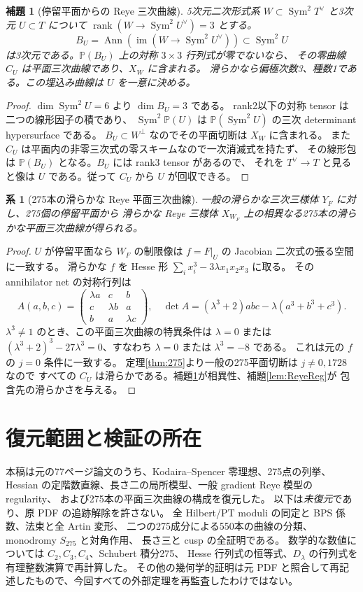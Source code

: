 \documentclass[11pt,a4paper]{ltjsarticle}
\newtheorem{lemma}[theorem]{補題}
\newtheorem{corollary}[theorem]{系}
\newcommand{\PP}{\mathbb P}
\newcommand{\Sym}{\operatorname{Sym}}
\newcommand{\rk}{\operatorname{rank}}
\newcommand{\Ann}{\operatorname{Ann}}
\begin{document}
\begin{lemma}[停留平面からの Reye 三次曲線]\label{lem:CU}
5次元二次形式系 $W\subset\Sym^2T^\vee$ と3次元 $U\subset T$ について
$\rk(W\to\Sym^2U^\vee)=3$ とする。
\[
 B_U=\Ann(\operatorname{im}(W\to\Sym^2U^\vee))\subset\Sym^2U
\]
は3次元である。$\PP(B_U)$ 上の対称 $3\times3$ 行列式が零でないなら、
その零曲線 $C_U$ は平面三次曲線であり、$X_W$ に含まれる。
滑らかなら偏極次数3、種数1である。この埋込み曲線は $U$ を一意に決める。
\end{lemma}
\begin{proof}
$\dim\Sym^2U=6$ より $\dim B_U=3$ である。
rank2以下の対称 tensor は二つの線形因子の積であり、
$\Sym^2\PP(U)$ は $\PP(\Sym^2U)$ の三次 determinant hypersurface である。
$B_U\subset W^\perp$ なのでその平面切断は $X_W$ に含まれる。
また $C_U$ は平面内の非零三次式の零スキームなので一次消滅式を持たず、
その線形包は $\PP(B_U)$ となる。$B_U$ には rank3 tensor があるので、
それを $T^\vee\to T$ と見ると像は $U$ である。従って $C_U$ から $U$ が回収できる。
\end{proof}

\begin{corollary}[275本の滑らかな Reye 平面三次曲線]\label{cor:275CU}
一般の滑らかな三次三様体 $Y_F$ に対し、275個の停留平面から
滑らかな Reye 三様体 $X_{W_F}$ 上の相異なる275本の滑らかな平面三次曲線が得られる。
\end{corollary}
\begin{proof}
$U$ が停留平面なら $W_F$ の制限像は $f=F|_U$ の Jacobian 二次式の張る空間に一致する。
滑らかな $f$ を Hesse 形 $\sum_i x_i^3-3\lambda x_1x_2x_3$ に取る。
その annihilator net の対称行列は
\[
 A(a,b,c)=\begin{pmatrix}\lambda a&c&b\\c&\lambda b&a\\b&a&\lambda c\end{pmatrix},
\quad \det A=(\lambda^3+2)abc-\lambda(a^3+b^3+c^3).
\]
$\lambda^3\ne1$ のとき、この平面三次曲線の特異条件は
$\lambda=0$ または $(\lambda^3+2)^3-27\lambda^3=0$、すなわち
$\lambda=0$ または $\lambda^3=-8$ である。
これは元の $f$ の $j=0$ 条件に一致する。
定理\ref{thm:275}より一般の275平面切断は $j\ne0,1728$ なので
すべての $C_U$ は滑らかである。補題\ref{lem:CU}が相異性、補題\ref{lem:ReyeReg}が
包含先の滑らかさを与える。
\end{proof}

\section{復元範囲と検証の所在}
本稿は元の77ページ論文のうち、Kodaira--Spencer 零理想、275点の列挙、
Hessian の定階数直線、長さ二の局所模型、一般 gradient Reye 模型の regularity、
および275本の平面三次曲線の構成を復元した。
以下は\emph{未復元}であり、原 PDF の追跡解除を許さない。
全 Hilbert/PT moduli の同定と BPS 係数、法束と全 Artin 変形、
二つの275成分による550本の曲線の分類、monodromy $S_{275}$ と対角作用、
長さ三と cusp の全証明である。
数学的な数値については $C_2,C_3,C_4$、Schubert 積分275、
Hesse 行列式の恒等式、$D_\lambda$ の行列式を有理整数演算で再計算した。
その他の幾何学的証明は元 PDF と照合して再記述したもので、今回すべての外部定理を再監査したわけではない。
\end{document}
